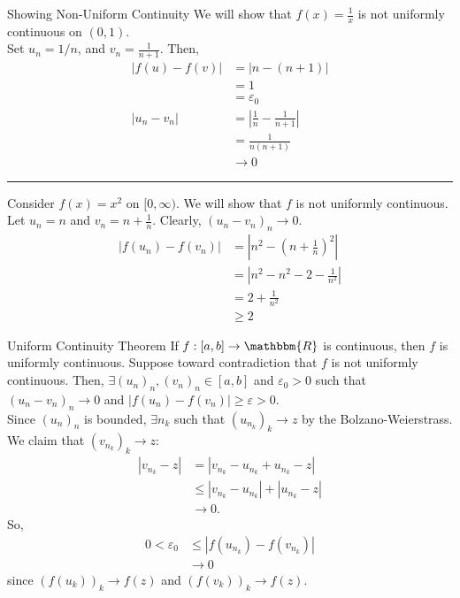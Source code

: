 \documentclass[10pt]{extarticle}
\newcommand{\R}{\mathbbm{R}}
\begin{document}
  \begin{problem}{Showing Non-Uniform Continuity}
    We will show that $f(x) = \frac{1}{x}$ is not uniformly continuous on $(0,1)$.\\

    Set $u_n = 1/n$, and $v_n = \frac{1}{n+1}$. Then,
    \begin{align*}
      |f(u) - f(v)| &= |n-(n+1)|\\
                    &= 1\\
                    &=\varepsilon_0\\
      |u_n - v_n| &= \left|\frac{1}{n} - \frac{1}{n+1}\right|\\
                  &= \frac{1}{n(n+1)}\\
                  &\rightarrow 0
    \end{align*}
    \vspace{4pt}
    \rule{\textwidth}{0.4pt}
    \vspace{4pt}
    Consider $f(x) = x^2$ on $[0,\infty)$. We will show that $f$ is not uniformly continuous.\\

    Let $u_n = n$ and $v_n = n + \frac{1}{n}$. Clearly, $(u_n - v_n)_n \rightarrow 0$.
    \begin{align*}
      |f(u_n) - f(v_n)| &= \left|n^2 - \left(n+\frac{1}{n}\right)^2\right|\\
                        &= \left|n^2 - n^2 - 2 - \frac{1}{n^2}\right|\\
                        &= 2 + \frac{1}{n^2}\\
                        &\geq 2
    \end{align*}
  \end{problem}
  \begin{problem}{Uniform Continuity Theorem}
    If $f: [a,b] \rightarrow \R$ is continuous, then $f$ is uniformly continuous.
    \tcblower
    Suppose toward contradiction that $f$ is not uniformly continuous. Then, $\exists (u_n)_n,(v_n)_n\in [a,b]$ and $\varepsilon_0 > 0$ such that $(u_n - v_n)_n \rightarrow 0$ and $|f(u_n)-f(v_n)| \geq \varepsilon>0$.\\

    Since $(u_n)_n$ is bounded, $\exists n_k$ such that $(u_{n_k})_k \rightarrow z$ by the Bolzano-Weierstrass. We claim that $(v_{n_k})_k \rightarrow z$:
    \begin{align*}
      \left|v_{n_k} - z\right| &= \left|v_{n_k} - u_{n_k} + u_{n_k} - z\right|\\
                               &\leq \left|v_{n_k} - u_{n_k}\right| + \left|u_{n_k} - z\right|\\
                               &\rightarrow 0.
    \end{align*}
    So,
    \begin{align*}
      0 < \varepsilon_0 &\leq |f(u_{n_k}) - f(v_{n_k})|\\
                    &\rightarrow 0
    \end{align*}
    since $(f(u_k))_k \rightarrow f(z)$ and $\left(f(v_k)\right)_k \rightarrow f(z)$.
  \end{problem}
\end{document}
